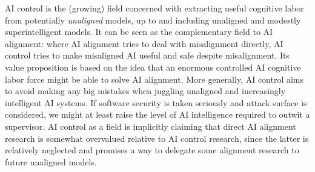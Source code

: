 

AI control \cite{greenblatt2024aicontrol} is the (growing) field concerned with
extracting useful cognitive labor from potentially \emph{unaligned} models, up
to and including unaligned and modestly superintelligent models. It can be seen
as the complementary field to AI alignment: where AI alignment tries to deal
with misalignment directly, AI control tries to make misaligned AI useful and
safe despite misalignment. Its value proposition is based on the idea that an
enormous controlled AI cognitive labor force might be able to solve AI
alignment. More generally, AI control aims to avoid making any big mistakes
when juggling unaligned and increasingly intelligent AI systems. If software
security is taken seriously and attack surface is considered, we might at least
raise the level of AI intelligence required to outwit a supervisor. AI control
as a field is implicitly claiming that direct AI alignment research is somewhat
overvalued relative to AI control research, since the latter is relatively
neglected and promises a way to delegate some alignment research to future
unaligned models.

